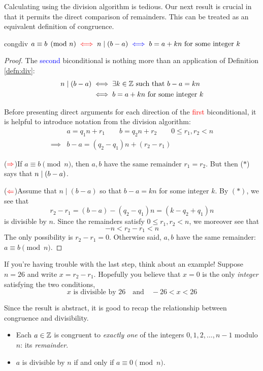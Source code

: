 Calculating using the division algorithm is tedious. Our next result is crucial in that it permits the direct comparison of remainders. This can be treated as an equivalent definition of congruence. 

\begin{thm}{}{congdiv}
	$a\equiv b\pmod n\mathrel{\textcolor{red}{\iff}} n\mid (b-a) \mathrel{\textcolor{blue}{\iff}} b=a+kn\text{ for some integer }k$
\end{thm}

\begin{proof}
	The \textcolor{blue}{second} biconditional is nothing more than an application of Definition \ref{defn:div}:
	\begin{align*}
		n\mid(b-a)&\iff \exists k\in\mathbb{Z}\text{ such that }b-a=kn\\
 		&\iff b=a+kn\text{ for some integer }k
	\end{align*}

	Before presenting direct arguments for each direction of the \textcolor{red}{first} biconditional, it is helpful to introduce notation from the division algorithm:
	\begin{align*}
		&a=q_1n+r_1\qquad b=q_2n+r_2\qquad 0\le r_1,r_2<n\\[1pt]
		\implies &b-a=(q_2-q_1)n+(r_2-r_1) \tag{$\ast$}
	\end{align*}
	
	($\textcolor{red}{\Rightarrow}$)\lstsp If $a\equiv b\pmod n$, then $a,b$ have the same remainder $r_1=r_2$. But then ($\ast$) says that $n\mid(b-a)$.
	\smallbreak
	
	($\textcolor{red}{\Leftarrow}$)\lstsp Assume that $n\mid(b-a)$ so that $b-a=kn$ for some integer $k$. By $(\ast)$, we see that
	\[
		r_2-r_1=(b-a)-(q_2-q_1)n=(k-q_2+q_1)n
	\]
	is divisible by $n$. Since the remainders satisfy $0\le r_1,r_2<n$, we moreover see that
	\[
		-n<r_2-r_1<n
	\]
	The only possibility is $r_2-r_1=0$. Otherwise said, $a,b$ have the same remainder: $a\equiv b\pmod n$.
\end{proof}

If you're having trouble with the last step, think about an example! Suppose $n=26$ and write $x=r_2-r_1$. Hopefully you believe that $x=0$ is the only \emph{integer} satisfying the two conditions,
\[
	x\text{ is divisible by }26\quad\text{and}\quad -26<x<26 %
\]

Since the result is abstract, it is good to recap the relationship between congruence and divisibility.\vspace{-3pt}
\begin{tcolorbox}[highlight math, left=-4pt]
	\begin{itemize}\itemsep1pt
		\item Each $a\in\mathbb{Z}$ is congruent to \emph{exactly one} of the integers $0,1,2,\ldots,n-1$ modulo $n$: its \emph{remainder}.
		\item $a$ is divisible by $n$ if and only if $a\equiv 0\pmod n$. 
	\end{itemize}
\end{tcolorbox}


